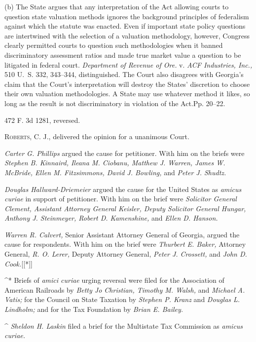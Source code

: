   (b) The State argues that any interpretation of the Act allowing
courts to question state valuation methods ignores the background
principles of federalism against which the statute was enacted. Even if
important state policy questions are intertwined with the selection of
a valuation methodology, however, Congress clearly permitted courts to
question such methodologies when it banned discriminatory assessment
ratios and made true market value a question to be litigated in federal
court. \emph{Department of Revenue of Ore.} v. \emph{ACF Industries, Inc.,}
510 U.~S. 332, 343--344, distinguished. The Court also disagrees
with Georgia's claim that the Court's interpretation will destroy
the States' discretion to choose their own valuation methodologies.
A State may use whatever method it likes, so long as the result is not
discriminatory in violation of the Act.Pp. 20--22.

472 F. 3d 1281, reversed.

  \textsc{Roberts,} C. J., delivered the opinion for a unanimous Court.

  \emph{Carter G. Phillips} argued the cause for petitioner. With him on
the briefs were \emph{Stephen B. Kinnaird, Ileana M. Ciobanu, Matthew J.
Warren, James W. McBride, Ellen M. Fitzsimmons, David J. Bowling,} and
\emph{Peter J. Shudtz.}

  \emph{Douglas Hallward-Driemeier} argued the cause for the United States
as \emph{amicus curiae} in support of petitioner. With him on the brief
were \emph{Solicitor General Clement, Assistant Attorney General Keisler,
Deputy Solicitor General Hungar, Anthony J. Steinmeyer, Robert D.
Kamenshine,} and \emph{Ellen D. Hanson.}

  \emph{Warren R. Calvert,} Senior Assistant Attorney General of Georgia,
argued the cause for respondents. With him on the brief were \emph{Thurbert
E. Baker,} Attorney General, \emph{R. O. Lerer,} Deputy Attorney General,
\emph{Peter J. Crossett,} and \emph{John D. Cook.}[[*]]

^* Briefs of \emph{amici curiae} urging reversal were filed for the
Association of American Railroads by \emph{Betty Jo Christian, Timothy M.
Walsh,} and \emph{Michael A. Vatis;} for the Council on State Taxation
by \emph{Stephen P. Kranz} and \emph{Douglas L. Lindholm;} and for the Tax
Foundation by \emph{Brian E. Bailey.}

^ \emph{Sheldon H. Laskin} filed a brief for the Multistate Tax Commission
as \emph{amicus curiae.}
